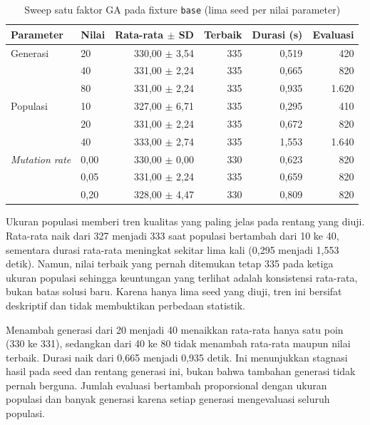 \begin{table}[H]
    \centering
    \small
    \caption{Sweep satu faktor GA pada fixture \texttt{base} (lima seed per nilai parameter)}
    \label{tab:ga-parameter-sweeps}
    \begin{tabular}{@{}llrrrr@{}}
        \toprule
        Parameter              & Nilai & Rata-rata $\pm$ SD & Terbaik & Durasi (s) & Evaluasi \\
        \midrule
        Generasi               & 20    & 330,00 $\pm$ 3,54  & 335     & 0,519      & 420      \\
                               & 40    & 331,00 $\pm$ 2,24  & 335     & 0,665      & 820      \\
                               & 80    & 331,00 $\pm$ 2,24  & 335     & 0,935      & 1.620    \\
        \midrule
        Populasi               & 10    & 327,00 $\pm$ 6,71  & 335     & 0,295      & 410      \\
                               & 20    & 331,00 $\pm$ 2,24  & 335     & 0,672      & 820      \\
                               & 40    & 333,00 $\pm$ 2,74  & 335     & 1,553      & 1.640    \\
        \midrule
        \textit{Mutation rate} & 0,00  & 330,00 $\pm$ 0,00  & 330     & 0,623      & 820      \\
                               & 0,05  & 331,00 $\pm$ 2,24  & 335     & 0,659      & 820      \\
                               & 0,20  & 328,00 $\pm$ 4,47  & 330     & 0,809      & 820      \\
        \bottomrule
    \end{tabular}
\end{table}

Ukuran populasi memberi tren kualitas yang paling jelas pada rentang yang diuji. Rata-rata naik dari 327 menjadi 333 saat populasi bertambah dari 10 ke 40, sementara durasi rata-rata meningkat sekitar lima kali (0,295 menjadi 1,553 detik). Namun, nilai terbaik yang pernah ditemukan tetap 335 pada ketiga ukuran populasi sehingga keuntungan yang terlihat adalah konsistensi rata-rata, bukan batas solusi baru. Karena hanya lima seed yang diuji, tren ini bersifat deskriptif dan tidak membuktikan perbedaan statistik.

Menambah generasi dari 20 menjadi 40 menaikkan rata-rata hanya satu poin (330 ke 331), sedangkan dari 40 ke 80 tidak menambah rata-rata maupun nilai terbaik. Durasi naik dari 0,665 menjadi 0,935 detik. Ini menunjukkan stagnasi hasil pada seed dan rentang generasi ini, bukan bahwa tambahan generasi tidak pernah berguna. Jumlah evaluasi bertambah proporsional dengan ukuran populasi dan banyak generasi karena setiap generasi mengevaluasi seluruh populasi.

